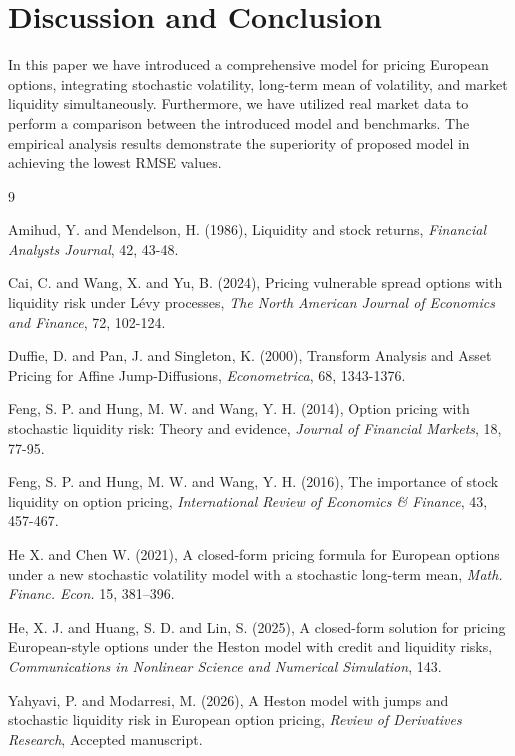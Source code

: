 \documentclass[twoside]{article}
\begin{document}
\section*{Discussion and Conclusion} 
In this paper we have introduced a comprehensive model for pricing European options, integrating stochastic volatility, long-term mean of volatility, and 
market liquidity simultaneously. Furthermore, we have utilized real market data to perform a comparison between the introduced model and benchmarks. 
The empirical analysis results demonstrate the superiority of proposed model in achieving the lowest RMSE values. 


\begin{thebibliography}{9}

Amihud, Y. and Mendelson, H. (1986), Liquidity and stock returns, {\it Financial Analysts Journal}, 42, 43-48.

Cai, C. and Wang, X. and Yu, B. (2024), Pricing vulnerable spread options with liquidity risk under Lévy processes, 
{\it The North American Journal of Economics and Finance}, 72, 102-124.

Duffie, D. and Pan, J. and Singleton, K. (2000), Transform Analysis and Asset Pricing for Affine Jump-Diffusions, 
{\it Econometrica}, 68, 1343-1376.

Feng, S. P. and Hung, M. W. and Wang, Y. H. (2014), Option pricing with stochastic liquidity risk: Theory and evidence,
{\it Journal of Financial Markets}, 18, 77-95.
 
Feng, S. P. and Hung, M. W. and Wang, Y. H. (2016), The importance of stock liquidity on option pricing,
{\it International Review of Economics \& Finance}, 43, 457-467.

He X. and Chen W. (2021), A closed-form pricing formula for European options under a new stochastic volatility model with a stochastic long-term mean, 
{\it Math. Financ. Econ.} 15, 381–396.

He, X. J. and Huang, S. D. and Lin, S. (2025), A closed-form solution for pricing European-style options under the Heston model with credit and liquidity risks,
{\it Communications in Nonlinear Science and Numerical Simulation}, 143. 

Yahyavi, P. and Modarresi, M. (2026), A Heston model with jumps and stochastic liquidity risk in European option pricing, 
{\it Review of Derivatives Research}, Accepted manuscript. 


\end{thebibliography}
 
\end{document}
